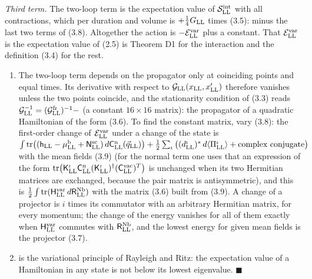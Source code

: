 \documentclass[
  10pt,
]{article}
\begin{document}
\emph{Third term.} The two-loop term is the expectation value of
\(\mathcal S^{\rm int}_{\rm LL}\) with all contractions, which per
duration and volume is \(+\tfrac14G_{\rm LL}\) times (3.5): minus the
last two terms of (3.8). Altogether the action is
\(-\mathcal E^{\rm var}_{\rm LL}\) plus a constant. That
\(\mathcal E^{\rm var}_{\rm LL}\) is the expectation value of (2.5) is
Theorem D1 for the interaction and the definition (3.4) for the rest.

\begin{enumerate}
\def\labelenumi{(\alph{enumi})}
\setcounter{enumi}{1}
\item
  The two-loop term depends on the propagator only at coinciding points
  and equal times. Its derivative with respect to
  \(\mathcal G_{\rm LL}(x_{\rm LL},x'_{\rm LL})\) therefore vanishes
  unless the two points coincide, and the stationarity condition of
  (3.3) reads
  \(\mathcal G_{\rm LL}^{-1}=(\mathcal G^{\rm fr}_{\rm LL})^{-1}-\) (a
  constant \(16\times16\) matrix): the propagator of a quadratic
  Hamiltonian of the form (3.6). To find the constant matrix, vary
  (3.8): the first-order change of \(\mathcal E^{\rm var}_{\rm LL}\)
  under a change of the state is
  \(\int\mathrm{tr}\big((\mathsf h_{\rm LL}-\mu^{\rm b}_{\rm LL}+\mathsf N^{\rm sc}_{\rm LL})\,d\mathsf C^{\rm n}_{\rm LL}(\vec q_{\rm LL})\big) +\tfrac12\sum_\iota\big((d^\iota_{\rm LL})^*\,d\langle\Pi^\iota_{\rm LL}\rangle+\text{complex conjugate}\big)\)
  with the mean fields (3.9) (for the normal term one uses that an
  expression of the form
  \(\mathrm{tr}\big(\mathsf K^\iota_{\rm LL}\mathsf C^{\rm n}_{\rm LL}(\mathsf K^\iota_{\rm LL})^\dagger(\mathsf C^{\rm vac}_{\rm LL})^T\big)\)
  is unchanged when its two Hermitian matrices are exchanged, because
  the pair matrix is antisymmetric), and this is
  \(\tfrac12\int\mathrm{tr}(\mathsf H^{\rm var}_{\rm LL}\,d\mathsf R^{\rm Nb}_{\rm LL})\)
  with the matrix (3.6) built from (3.9). A change of a projector is
  \(i\) times its commutator with an arbitrary Hermitian matrix, for
  every momentum; the change of the energy vanishes for all of them
  exactly when \(\mathsf H^{\rm var}_{\rm LL}\) commutes with
  \(\mathsf R^{\rm Nb}_{\rm LL}\), and the lowest energy for given mean
  fields is the projector (3.7).
\item
  is the variational principle of Rayleigh and Ritz: the expectation
  value of a Hamiltonian in any state is not below its lowest
  eigenvalue. \(\blacksquare\)
\end{enumerate}
\end{document}
